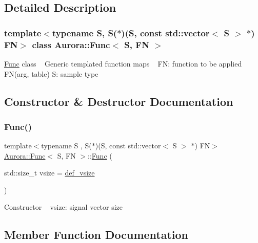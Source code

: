 \subsection{Detailed Description}
\subsubsection*{template$<$typename S, S($\ast$)(\+S, const std\+::vector$<$ S $>$ $\ast$) FN$>$\newline
class Aurora\+::\+Func$<$ S, F\+N $>$}

\hyperlink{class_aurora_1_1_func}{Func} class ~\newline
Generic templated function maps ~\newline
FN\+: function to be applied F\+N(arg, table) S\+: sample type 

\subsection{Constructor \& Destructor Documentation}
\mbox{\label{class_aurora_1_1_func_a2a97c0f4eaf70c7e922876debeb14abe}} 
\subsubsection{\texorpdfstring{Func()}{Func()}}
{\footnotesize\ttfamily template$<$typename S , S($\ast$)(\+S, const std\+::vector$<$ S $>$ $\ast$) FN$>$ \\
\hyperlink{class_aurora_1_1_func}{Aurora\+::\+Func}$<$ S, FN $>$\+::\hyperlink{class_aurora_1_1_func}{Func} (\begin{DoxyParamCaption}\item[{std\+::size\+\_\+t}]{vsize = {\ttfamily \hyperlink{namespace_aurora_afaaddf667a06e7ce23c667a8b7295263}{def\+\_\+vsize}} }\end{DoxyParamCaption})\hspace{0.3cm}{\ttfamily [inline]}}

Constructor ~\newline
vsize\+: signal vector size 

\subsection{Member Function Documentation}
\mbox{\label{class_aurora_1_1_func_a83402c97421f1a82e818c4ab849dc47e}} 
